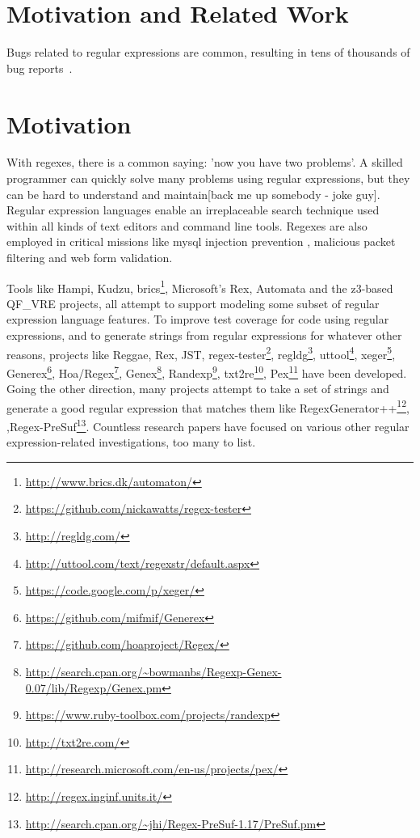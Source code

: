 \section{Motivation and Related Work}
\label{sec:motivation}
Bugs related to regular expressions are common, resulting in tens of thousands of bug reports~\cite{Spishak:2012:TSR:2318202.2318207}.

\section{Motivation}

With regexes, there is a common saying: 'now you have two problems'.
A skilled programmer can quickly solve many problems using regular expressions, but they can be hard to understand and maintain[back me up somebody - joke guy].
Regular expression languages enable an irreplaceable search technique used within all kinds of text editors and command line tools.
Regexes are also employed in critical missions like mysql injection prevention , malicious packet filtering  and web form validation.

Tools like Hampi, Kudzu, brics\footnote{\url{http://www.brics.dk/automaton/}}, Microsoft's Rex, Automata and the z3-based QF\_VRE projects, all attempt to support modeling some subset of regular expression language features.
To improve test coverage for code using regular expressions, and to generate strings from regular expressions for whatever other reasons, projects like Reggae, Rex, JST, regex-tester\footnote{\url{https://github.com/nickawatts/regex-tester}}, regldg\footnote{\url{http://regldg.com/}},
uttool\footnote{\url{http://uttool.com/text/regexstr/default.aspx}}, xeger\footnote{\url{https://code.google.com/p/xeger/}}, Generex\footnote{\url{https://github.com/mifmif/Generex}}, Hoa/Regex\footnote{\url{https://github.com/hoaproject/Regex/}}, Genex\footnote{\url{http://search.cpan.org/~bowmanbs/Regexp-Genex-0.07/lib/Regexp/Genex.pm}}, Randexp\footnote{\url{https://www.ruby-toolbox.com/projects/randexp}}, txt2re\footnote{\url{http://txt2re.com/}}, Pex\footnote{\url{http://research.microsoft.com/en-us/projects/pex/}} have been developed.
Going the other direction, many projects attempt to take a set of strings and generate a good regular expression that matches them like RegexGenerator++\footnote{\url{http://regex.inginf.units.it/}}, ,Regex-PreSuf\footnote{\url{http://search.cpan.org/~jhi/Regex-PreSuf-1.17/PreSuf.pm}}.
Countless research papers have focused on various other regular expression-related investigations, too many to list.

